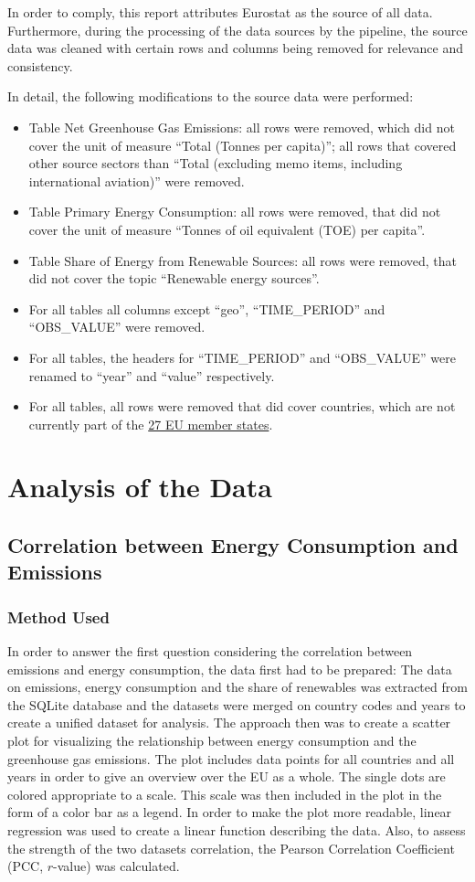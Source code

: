 \documentclass{article}
\begin{document}
In order to comply, this report attributes Eurostat as the source of all data.
Furthermore, during the processing of the data sources by the pipeline, the source data was cleaned with certain
rows and columns being removed for relevance and consistency.

In detail, the following modifications to the source data were performed:
\begin{itemize}
    \item Table Net Greenhouse Gas Emissions: all rows were removed, which did not cover the unit of measure “Total (Tonnes per capita)”;
    all rows that covered other source sectors than “Total (excluding memo items, including international aviation)” were removed.
    \item Table Primary Energy Consumption: all rows were removed, that did not cover the unit of measure “Tonnes of oil equivalent (TOE) per capita”.
    \item Table Share of Energy from Renewable Sources: all rows were removed, that did not cover the topic “Renewable energy sources”.
    \item For all tables all columns except “geo”, “TIME\_PERIOD” and “OBS\_VALUE” were removed.
    \item For all tables, the headers for “TIME\_PERIOD” and “OBS\_VALUE” were renamed to “year” and “value” respectively.
    \item For all tables, all rows were removed that did cover countries, which are not currently part of the \href{https://www.destatis.de/Europa/EN/Country/Country-Codes.html}{27 EU member states}.
\end{itemize}

\section*{Analysis of the Data}
\subsection*{Correlation between Energy Consumption and Emissions}
\subsubsection*{Method Used}
In order to answer the first question considering the correlation between emissions and energy consumption, the data first had to be prepared:
The data on emissions, energy consumption and the share of renewables was extracted from the SQLite database and the datasets were merged on
country codes and years to create a unified dataset for analysis.
The approach then was to create a scatter plot for visualizing the relationship between energy consumption and the
greenhouse gas emissions. The plot includes data points for all countries and all years in order to give an overview
over the EU as a whole. The single dots are colored appropriate to a scale.
This scale was then included in the plot in the form of a color bar as a legend.
In order to make the plot more readable, linear regression was used to create a linear function describing the data.
Also, to assess the strength of the two datasets correlation, the Pearson Correlation Coefficient (PCC, $r$-value) was calculated.
\end{document}
